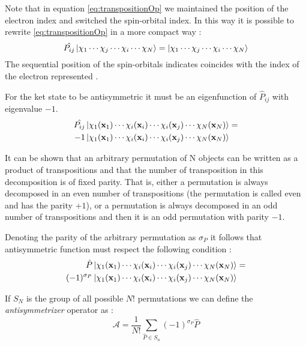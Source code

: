 \documentclass[a4paper,12pt]{article}
\begin{document}
Note that in equation \eqref{eq:transpositionOp} we maintained the position of the electron index and switched the spin-orbital index. In this way it is possible to rewrite \eqref{eq:transpositionOp} in a more compact way :
\begin{equation}
	\hat{P_{ij}}  \ket{\chi_1  \cdots  \chi_j  \cdots  \chi_i  \cdots   \chi_N} =  
		 \ket{\chi_1   \cdots  \chi_j  \cdots  \chi_i \cdots  \chi_N} 
\end{equation}
The sequential position of the spin-orbitals indicates coincides with the index of the electron represented \cite{Sakurai}.


For the ket state to be antisymmetric it must be an eigenfunction of $\hat{P}_{ij}$ with eigenvalue $-1$.
\begin{align*}
	\hat{P_{ij}} & \ket{\chi_1(\mathbf{x}_1)   \cdots  \chi_i(\mathbf{x}_i)  \cdots  \chi_i(\mathbf{x}_j)  \cdots   \chi_N(\mathbf{x}_N)} =  \\
	-1 & \ket{\chi_1(\mathbf{x}_1)   \cdots  \chi_i(\mathbf{x}_i)  \cdots  \chi_i(\mathbf{x}_j) \cdots  \chi_N(\mathbf{x}_N)} 
\end{align*}

It can be shown that an arbitrary permutation of N objects can be written as a product of transpositions and that the number of transposition in this decomposition is of fixed parity. That is, either a permutation is always decomposed in an even number of transpositions (the permutation is called even and has the parity $+1$), or a permutation is always decomposed in an odd number of transpositions and then it is an odd permutation with parity  $ - 1$.

Denoting the parity of the arbitrary permutation as $\sigma_P$ it follows that antisymmetric function must respect the following condition :
\begin{align*}
	\hat{P} & \ket{\chi_1(\mathbf{x}_1)   \cdots  \chi_i(\mathbf{x}_i)  \cdots  \chi_i(\mathbf{x}_j)  \cdots   \chi_N(\mathbf{x}_N)} = \\
	(-1)^{\sigma_P}  & \ket{\chi_1(\mathbf{x}_1)   \cdots  \chi_i(\mathbf{x}_i)  \cdots  \chi_i(\mathbf{x}_j)  \cdots   \chi_N(\mathbf{x}_N)}
\end{align*}

If $S_N$ is the group of all possible $N!$ permutations we can define the \textit{antisymmetrizer} operator as :
\begin{equation}\label{eq:antisymmetrizer}
	\mathcal{A} = \frac{1}{N!} \sum_{\hat{P} \in S_n} (-1)^{\sigma_P} \hat{P}
\end{equation}
\end{document}
